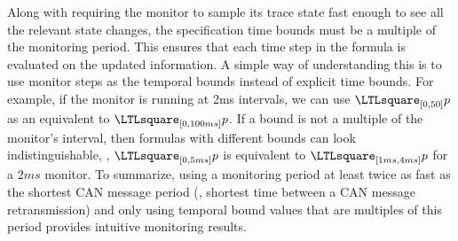 Along with requiring the monitor to sample its trace state fast enough to see all the relevant state changes, the specification time bounds must be a multiple of the monitoring period.
This ensures that each time step in the formula is evaluated on the updated information.
A simple way of understanding this is to use monitor steps as the temporal bounds instead of explicit time bounds.
For example, if the monitor is running at  2ms intervals, we can use $\henceforth_{[0,50]} p$ as an equivalent to
$\henceforth_{[0,100ms]} p$.
If a bound is not a multiple of the monitor's interval, then formulas with different bounds can look indistinguishable,
\eg, $\henceforth_{[0,5ms]} p$ is equivalent to $\henceforth_{[1ms,4ms]} p$ for a $2ms$ monitor.
%
To summarize, using a monitoring period at least twice as fast as the shortest
CAN message period (\ie, shortest time between a CAN message retransmission)
and only using temporal bound values that are multiples of this period provides intuitive monitoring results.


